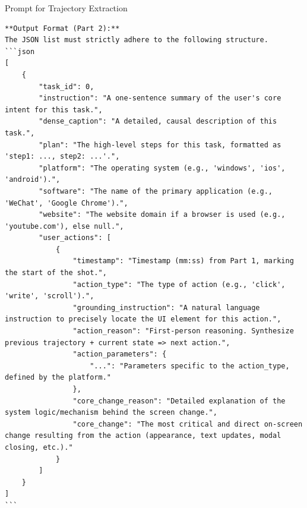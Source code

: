 \documentclass{article}
\theoremstyle{plain}
\theoremstyle{definition}
\theoremstyle{remark}
\begin{document}
\begin{promptbox}{Prompt for Trajectory Extraction}
\begin{lstlisting}
**Output Format (Part 2):**
The JSON list must strictly adhere to the following structure.
```json
[
    {
        "task_id": 0,
        "instruction": "A one-sentence summary of the user's core intent for this task.",
        "dense_caption": "A detailed, causal description of this task.",
        "plan": "The high-level steps for this task, formatted as 'step1: ..., step2: ...'.",
        "platform": "The operating system (e.g., 'windows', 'ios', 'android').",
        "software": "The name of the primary application (e.g., 'WeChat', 'Google Chrome').",
        "website": "The website domain if a browser is used (e.g., 'youtube.com'), else null.",
        "user_actions": [
            {
                "timestamp": "Timestamp (mm:ss) from Part 1, marking the start of the shot.",
                "action_type": "The type of action (e.g., 'click', 'write', 'scroll').",
                "grounding_instruction": "A natural language instruction to precisely locate the UI element for this action.",
                "action_reason": "First-person reasoning. Synthesize previous trajectory + current state => next action.",
                "action_parameters": {
                    "...": "Parameters specific to the action_type, defined by the platform."
                },
                "core_change_reason": "Detailed explanation of the system logic/mechanism behind the screen change.",
                "core_change": "The most critical and direct on-screen change resulting from the action (appearance, text updates, modal closing, etc.)."
            }
        ]
    }
]
```


\end{lstlisting}
\end{promptbox}
\end{document}
